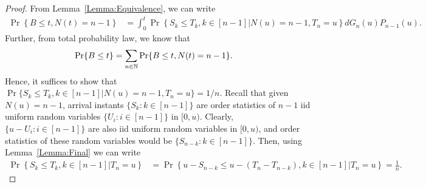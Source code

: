 \documentclass[a4paper,english,10pt]{article}
\begin{document}
\begin{proof}
From Lemma~\ref{Lemma:Equivalence}, we can write
\begin{align*}
\Pr\left\{B \leq t , N(t) = n-1\right\} 
& = \int_{0}^{t}\Pr\left\{ S_k \leq T_k , k\in [n-1] \Big| N(u)=n-1, T_n=u \right\}dG_n(u) P_{n-1}(u) .
\end{align*}
Further, from total probability law, we know that
\begin{align*}
\Pr\{B \leq t\} &=\sum_{n \in \mathbb{N}}\Pr\{B \leq t, N(t)=n-1\}.
\end{align*}
Hence, it suffices to show that $\Pr\{ S_k \leq T_k , k\in [n-1] | N(u)=n-1, T_n=u \} = 1/n$. 
Recall that given $N(u) = n-1$, arrival instants $\{S_k: k \in [n-1]\}$ are order statistics of $n-1$ iid uniform random variables  $\{U_i: i \in [n-1]\}$ in $[0,u)$. 
Clearly, $\{u-U_i: i \in [n-1]\}$ are also iid uniform random variables in $[0,u)$, and order statistics of these random variables would be $\{S_{n-k}: k \in [n-1]\}$.
Then, using Lemma~\ref{Lemma:Final} we can write
\begin{align*}
\Pr\left\{S_k \leq T_k, k \in [n-1]\Big| T_n=u\right\}
&= \Pr\left\{u-S_{n-k} \leq u - (T_n - T_{n-k}),k \in[n-1] \Big| T_n=u\right\}
=\frac{1}{n}.
\end{align*}
\end{proof}
\end{document}
